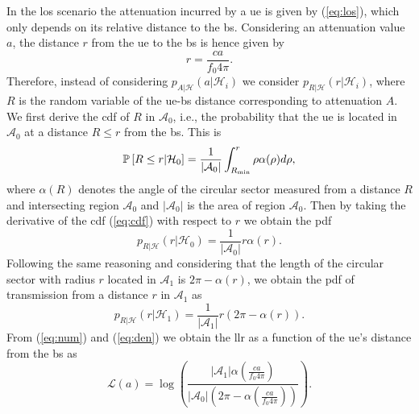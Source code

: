 \documentclass[conference,final]{IEEEtran}
\newcommand{\pr}[1]{\mathbb{P} \left[ #1 \right]}
\begin{document}
In the \ac{los} scenario the attenuation incurred by a \ac{ue} is given by (\ref{eq:los}), which only depends on its relative distance to the \ac{bs}. Considering an attenuation value $a$, the distance $r$ from the \ac{ue} to the \ac{bs} is hence given by 
\begin{equation}
    r = \frac{c a}{f_0 4 \pi}.
\end{equation}
Therefore, instead of considering $p_{A|\mathcal{H}}(a|\mathcal H_i)$ we consider $p_{R|\mathcal{H}}(r|\mathcal H_i)$, where $R$ is the random variable of the \ac{ue}-\ac{bs} distance corresponding to attenuation $A$. We first derive the \ac{cdf} of $R$ in $\mathcal{A}_0$, i.e.,  the probability that the \ac{ue} is located in $\mathcal{A}_0$ at a distance $R\le r$ from the \ac{bs}. This is
\begin{equation}\label{eq:cdf}
     \pr{R \le r|\mathcal{H}_0} = \frac{1}{|\mathcal{A}_0|}\int_{R_{\rm min}}^{r} \rho \alpha(\rho) d\rho,     
\end{equation}
where $\alpha(R)$ denotes the angle of the circular sector measured from a distance $R$ and intersecting region $\mathcal{A}_0$ and $|\mathcal{A}_0|$ is the area of region $\mathcal{A}_0$. Then by taking the derivative of the \ac{cdf} (\ref{eq:cdf}) with respect to $r$ we obtain the \ac{pdf} 
\begin{equation}\label{eq:num}
    p_{R|\mathcal{H}}(r|\mathcal{H}_0) = \frac{1}{|\mathcal{A}_0|}r\alpha(r).
\end{equation}
Following the same reasoning and considering that the length of the circular sector with radius $r$ located in $\mathcal{A}_1$ is $2\pi - \alpha(r)$, we obtain the \ac{pdf} of transmission from a distance $r$ in $\mathcal{A}_1$ as
\begin{equation}\label{eq:den}
     p_{R|\mathcal{H}}(r|\mathcal{H}_1) = \frac{1}{|\mathcal{A}_1|}r\left(2\pi-\alpha(r)\right).
\end{equation}
From (\ref{eq:num}) and (\ref{eq:den}) we obtain the \ac{llr} as a function of the \ac{ue}'s distance from the \ac{bs} as 
\begin{equation}
    \mathcal{L}{(a)}=\log\left(\frac{|\mathcal{A}_1|\alpha \left(\frac{c a}{f_0 4 \pi}\right)}{|\mathcal{A}_0|\left(2\pi-\alpha\left(\frac{c a}{f_0 4 \pi}\right)\right)}\right).
\end{equation}
\end{document}
